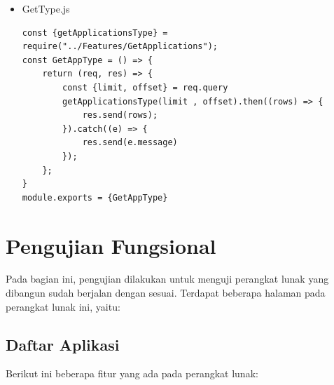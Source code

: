 \begin{enumerate}
\begin{itemize}
\item GetType.js
\begin{lstlisting}[label={lst:bbbbbb}, caption={Mendapatkan Daftar Apliakasi}]
const {getApplicationsType} = require("../Features/GetApplications");
const GetAppType = () => {
	return (req, res) => {
		const {limit, offset} = req.query
		getApplicationsType(limit , offset).then((rows) => {
			res.send(rows);
		}).catch((e) => {
			res.send(e.message)
		});
	};
}
module.exports = {GetAppType}
		\end{lstlisting}
	
	\end{itemize}
\end{enumerate}

\section{Pengujian Fungsional}
Pada bagian ini, pengujian dilakukan untuk menguji perangkat lunak yang dibangun sudah berjalan dengan sesuai. Terdapat beberapa halaman pada perangkat lunak ini, yaitu:
\subsection{Daftar Aplikasi}
Berikut ini beberapa fitur yang ada pada perangkat lunak:

